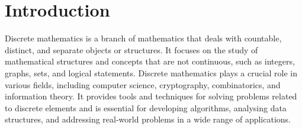 \chapter{Introduction}
Discrete mathematics is a branch of mathematics that deals with countable, distinct, and separate objects or structures. It focuses on the study of mathematical structures and concepts that are not continuous, such as integers, graphs, sets, and logical statements. Discrete mathematics plays a crucial role in various fields, including computer science, cryptography, combinatorics, and information theory. It provides tools and techniques for solving problems related to discrete elements and is essential for developing algorithms, analysing data structures, and addressing real-world problems in a wide range of applications.
